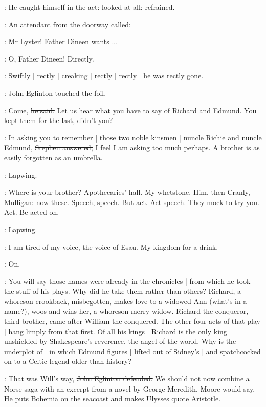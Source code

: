 :
He caught himself in the act:
looked at all:
refrained.

:
An attendant from the doorway called:

\attendant:
Mr Lyster!
Father Dineen wants ...

\librarian:
O, Father Dineen!
Directly.

:
Swiftly | rectly | creaking | rectly | rectly | he was rectly gone.

:
John Eglinton touched the foil.

\eglinton:
Come,
\sout{he said.}
Let us hear what you have to say of Richard and Edmund.
You kept them for the last,
didn't you?

\Stephen:
In asking you to remember |
those two noble kinsmen |
nuncle Richie and nuncle Edmund,
\sout{Stephen answered,}
I feel I am asking too much perhaps.
A brother is as easily forgotten as an umbrella.

\StephenInt:
Lapwing.

\StephenInt:
Where is your brother?
Apothecaries' hall.
My whetstone.
Him,
then Cranly,
Mulligan:
now these.
Speech,
speech.
But act.
Act speech.
They mock to try you.
Act.
Be acted on.

\StephenInt:
Lapwing.

\StephenInt:
I am tired of my voice,
the voice of Esau.
My kingdom for a drink.




\StephenInt:
On.

\Stephen:
You will say those names were already in the chronicles |
from which he took the stuff of his plays.
Why did he take them rather than others?
Richard,
a whoreson crookback,
misbegotten,
makes love to a widowed Ann
(what's in a name?),
woos and wins her,
a whoreson merry widow.
Richard the conqueror,
third brother,
came after William the conquered.
The other four acts of that play |
hang limply from that first.
Of all his kings |
Richard is the only king unshielded by Shakespeare's reverence,
the angel of the world.
Why is the underplot of  |
in which Edmund figures |
lifted out of Sidney's  |
and spatchcocked on to a Celtic legend older than history?

\eglinton:
That was Will's way,
\sout{John Eglinton defended.}
We should not now combine a Norse saga with an excerpt from a novel by George Meredith.
Moore would say.
He puts Bohemia on the seacoast and makes Ulysses quote Aristotle.

